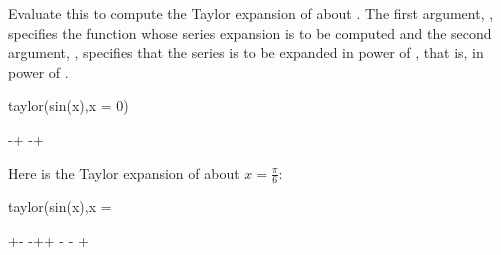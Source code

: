 {{{{{{{{{{{{{{\begin{xtc}
\begin{xtccomment}
Evaluate this
to compute the Taylor expansion of  about
.
The first argument, , specifies the function whose series
expansion is to be computed and the second argument, ,
specifies that the series is to be expanded in power of ,
that is, in power of .
\end{xtccomment}
\begin{spadsrc}
taylor(sin(x),x = 0)
\end{spadsrc}
\begin{TeXOutput}
\begin{fricasmath}{1}
-{\TIMES {}}+\TIMES %
-{\TIMES {}}+%
%
\end{fricasmath}
\end{TeXOutput}
\end{xtc}
\begin{xtc}
\begin{xtccomment}
Here is the Taylor expansion of  about
$x = \frac{\pi}{6}$:
\end{xtccomment}
\begin{spadsrc}
taylor(sin(x),x = %
\end{spadsrc}
\begin{TeXOutput}
\begin{fricasmath}{2}
+\TIMES {}-{%
\TIMES {}}-{\TIMES {}}+\TIMES {}+%
\TIMES {}-{\TIMES %
}-{%
\TIMES {}}+%
\end{fricasmath}
\end{TeXOutput}
\end{xtc}

}}}}}}}}}}}}}}

